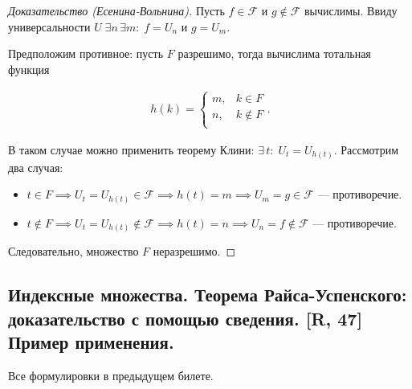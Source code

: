 \documentclass[a4paper, fleqn]{article}
\begin{document}
        \begin{proof}[Доказательство (Есенина-Вольнина)]
        Пусть $f \in \mathcal{F}$ и $g \notin \mathcal{F}$ вычислимы. Ввиду универсальности $U \; \exists n \, \exists m : \; f = U_n$ и $g = U_m$.

        Предположим противное: пусть $F$ разрешимо, тогда вычислима тотальная функция

        \begin{equation*}
        \begin{gathered}
        h(k) =
        \begin{cases}
        m, & k \in F \\
        n, & k \notin F \\
        \end{cases}.
        \end{gathered}
        \end{equation*}

        В таком случае можно применить теорему Клини: $\exists \, t : \; U_t = U_{h(t)}$. Рассмотрим два случая:

        \begin{itemize}
            \item $t \in F \implies U_t = U_{h(t)} \in \mathcal{F} \implies h(t) = m \implies U_m = g \in \mathcal{F}$ --- противоречие.

            \item $t \notin F \implies U_t = U_{h(t)} \notin \mathcal{F} \implies h(t) = n \implies U_n = f \notin \mathcal{F}$ --- противоречие.
        \end{itemize}

        Следовательно, множество $F$ неразрешимо.
        \end{proof}

    \subsection{Индексные множества. Теорема Райса-Успенского: доказательство с помощью сведения. [R, 47] Пример применения.}

        Все формулировки в предыдущем билете.
\end{document}
